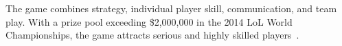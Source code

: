 The game combines strategy, individual player skill, communication, and team play. With a prize pool exceeding \$2,000,000 in the 2014 LoL World Championships, the game attracts serious and highly skilled players~\cite{lolprize}.


